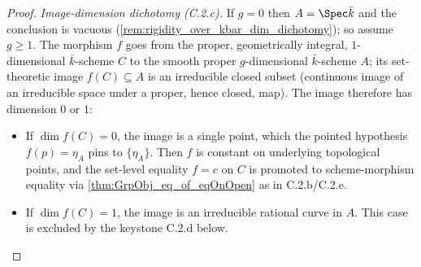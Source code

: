 \begin{proof}
  \emph{Image-dimension dichotomy (C.2.c).} If \(g = 0\) then
  \(A = \Spec \bar k\) and the conclusion is vacuous
  (\cref{rem:rigidity_over_kbar_dim_dichotomy}); so assume \(g \geq 1\). The
  morphism \(f\) goes from the proper, geometrically integral, \(1\)-dimensional
  \(\bar k\)-scheme \(C\) to the smooth proper \(g\)-dimensional \(\bar k\)-scheme
  \(A\); its set-theoretic image \(f(C) \subseteq A\) is an irreducible closed
  subset (continuous image of an irreducible space under a proper, hence closed,
  map). The image therefore has dimension \(0\) or \(1\):
  \begin{itemize}
    \item If \(\dim f(C) = 0\), the image is a single point, which the pointed
      hypothesis \(f(p) = \eta_A\) pins to \(\{\eta_A\}\). Then \(f\) is constant
      on underlying topological points, and the set-level equality
      \(f = c\) on \(C\) is promoted to scheme-morphism equality via
      \cref{thm:GrpObj_eq_of_eqOnOpen} as in C.2.b/C.2.e.
    \item If \(\dim f(C) = 1\), the image is an irreducible rational curve in
      \(A\). This case is excluded by the keystone C.2.d below.
  \end{itemize}


\end{proof}
